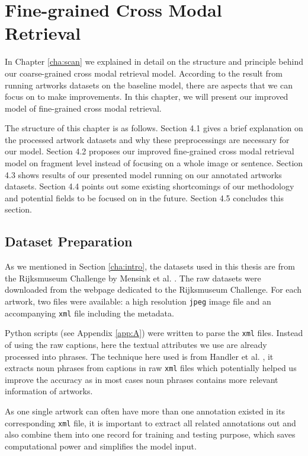 \chapter{Fine-grained Cross Modal Retrieval}
\label{cha:Method}

In Chapter \ref{cha:scan} we explained in detail on the structure and principle behind our coarse-grained cross modal retrieval model. According to the result from running artworks datasets on the baseline model, there are aspects that we can focus on to make improvements. In this chapter, we will present our improved model of fine-grained cross modal retrieval.

The structure of this chapter is as follows. Section 4.1 gives a brief explanation on the processed artwork datasets and why these preprocessings are necessary for our model. Section 4.2 proposes our improved fine-grained cross modal retrieval model on fragment level instead of focusing on a whole image or sentence. Section 4.3 shows results of our presented model running on our annotated artworks datasets. Section 4.4 points out some existing shortcomings of our methodology and potential fields to be focused on in the future. Section 4.5 concludes this section.

\section{Dataset Preparation}
As we mentioned in Section \ref{cha:intro}, the datasets used in this thesis are from the Rijksmuseum Challenge by Mensink et al. \cite{MensinkICMIR2014}. The raw datasets were downloaded from the webpage dedicated to the Rijksmuseum Challenge. For each artwork, two files were available: a high resolution \verb|jpeg| image file and an accompanying \verb|xml| file including the metadata.

Python scripts (see Appendix \ref{app:A}) were written to parse the \verb|xml| files. Instead of using the raw captions, here the textual attributes we use are already processed into phrases. The technique here used is from Handler et al. \cite{nounphrase}, it extracts noun phrases from captions in raw \verb|xml| files which potentially helped us improve the accuracy as in most cases noun phrases contains more relevant information of artworks.  

As one single artwork can often have more than one annotation existed in its corresponding \verb|xml| file, it is important to extract all related annotations out and also combine them into one record for training and testing purpose, which saves computational power and simplifies the model input. 

